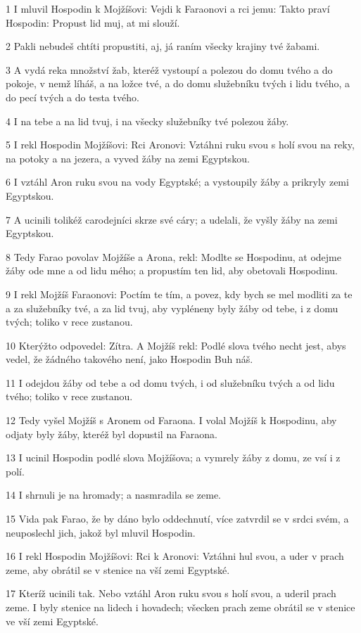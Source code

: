 \par 1 I mluvil Hospodin k Mojžíšovi: Vejdi k Faraonovi a rci jemu: Takto praví Hospodin: Propust lid muj, at mi slouží.
\par 2 Pakli nebudeš chtíti propustiti, aj, já raním všecky krajiny tvé žabami.
\par 3 A vydá reka množství žab, kteréž vystoupí a polezou do domu tvého a do pokoje, v nemž líháš, a na ložce tvé, a do domu služebníku tvých i lidu tvého, a do pecí tvých a do testa tvého.
\par 4 I na tebe a na lid tvuj, i na všecky služebníky tvé polezou žáby.
\par 5 I rekl Hospodin Mojžíšovi: Rci Aronovi: Vztáhni ruku svou s holí svou na reky, na potoky a na jezera, a vyved žáby na zemi Egyptskou.
\par 6 I vztáhl Aron ruku svou na vody Egyptské; a vystoupily žáby a prikryly zemi Egyptskou.
\par 7 A ucinili tolikéž carodejníci skrze své cáry; a udelali, že vyšly žáby na zemi Egyptskou.
\par 8 Tedy Farao povolav Mojžíše a Arona, rekl: Modlte se Hospodinu, at odejme žáby ode mne a od lidu mého; a propustím ten lid, aby obetovali Hospodinu.
\par 9 I rekl Mojžíš Faraonovi: Poctím te tím, a povez, kdy bych se mel modliti za te a za služebníky tvé, a za lid tvuj, aby vypléneny byly žáby od tebe, i z domu tvých; toliko v rece zustanou.
\par 10 Kterýžto odpovedel: Zítra. A Mojžíš rekl: Podlé slova tvého necht jest, abys vedel, že žádného takového není, jako Hospodin Buh náš.
\par 11 I odejdou žáby od tebe a od domu tvých, i od služebníku tvých a od lidu tvého; toliko v rece zustanou.
\par 12 Tedy vyšel Mojžíš s Aronem od Faraona. I volal Mojžíš k Hospodinu, aby odjaty byly žáby, kteréž byl dopustil na Faraona.
\par 13 I ucinil Hospodin podlé slova Mojžíšova; a vymrely žáby z domu, ze vsí i z polí.
\par 14 I shrnuli je na hromady; a nasmradila se zeme.
\par 15 Vida pak Farao, že by dáno bylo oddechnutí, více zatvrdil se v srdci svém, a neuposlechl jich, jakož byl mluvil Hospodin.
\par 16 I rekl Hospodin Mojžíšovi: Rci k Aronovi: Vztáhni hul svou, a uder v prach zeme, aby obrátil se v stenice na vší zemi Egyptské.
\par 17 Kteríž ucinili tak. Nebo vztáhl Aron ruku svou s holí svou, a uderil prach zeme. I byly stenice na lidech i hovadech; všecken prach zeme obrátil se v stenice ve vší zemi Egyptské.
